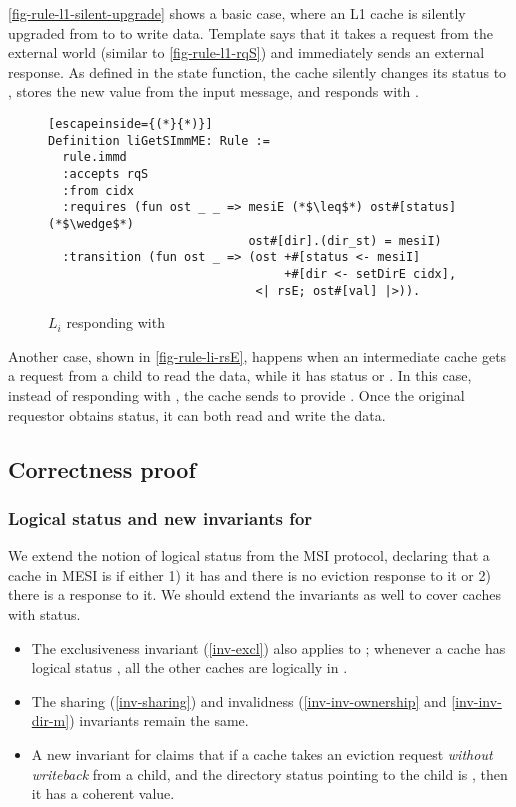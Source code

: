 \autoref{fig-rule-l1-silent-upgrade} shows a basic case, where an L1 cache is silently upgraded from \stE{} to \stM{} to write data.
Template  says that it takes a request from the external world (similar to \autoref{fig-rule-l1-rqS}) and immediately sends an external response.
As defined in the state  function, the cache silently changes its status to \stM{}, stores the new value from the input message, and responds with .

\begin{figure}[h]
  \centering
\begin{lstlisting}[escapeinside={(*}{*)}]
Definition liGetSImmME: Rule :=
  rule.immd
  :accepts rqS
  :from cidx
  :requires (fun ost _ _ => mesiE (*$\leq$*) ost#[status] (*$\wedge$*)
                            ost#[dir].(dir_st) = mesiI)
  :transition (fun ost _ => (ost +#[status <- mesiI]
                                 +#[dir <- setDirE cidx],
                             <| rsE; ost#[val] |>)).
\end{lstlisting}
  \caption{$L_i$ responding with }
  \label{fig-rule-li-rsE}
\end{figure}

Another case, shown in \autoref{fig-rule-li-rsE}, happens when an intermediate cache gets a request from a child to read the data, while it has status \stE{} or \stM{}.
In this case, instead of responding with , the cache sends  to provide \stE{}.
Once the original requestor obtains \stE{} status, it can both read and write the data.

\subsection{Correctness proof}
\label{sec-mesi-proof}

\subsubsection{Logical status and new invariants for \stE{}}

We extend the notion of logical status from the MSI protocol, declaring that a cache in MESI is \stE{} if either 1) it has \stE{} and there is no eviction response to it or 2) there is a response  to it.
We should extend the invariants as well to cover caches with \stE{} status.
\begin{itemize}
\item The exclusiveness invariant (\autoref{inv-excl}) also applies to \stE{}; whenever a cache has logical status \stE{}, all the other caches are logically in \stI{}.
\item The sharing (\autoref{inv-sharing}) and invalidness (\autoref{inv-inv-ownership} and \autoref{inv-inv-dir-m}) invariants remain the same.
\item A new invariant for \stE{} claims that if a cache takes an eviction request \emph{without writeback} from a child, and the directory status pointing to the child is \stE{}, then it has a coherent value.
\end{itemize}

